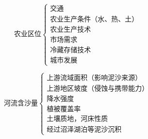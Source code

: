 \documentclass[UTF8]{ctexart}
\begin{document}
\par

\begin{multicols}{2}
    
    \[
        \textbf{农业区位}
        \begin{cases}
            \text{交通}\\
            \text{农业生产条件（水、热、土）}\\
            \text{农业生产技术}\\
            \text{市场需求}\\
            \text{冷藏存储技术}\\
            \text{城市发展}
        \end{cases}
    \]

    \[
        \textbf{河流含沙量}
        \begin{cases}
            \text{上游流域面积（影响泥沙来源）}\\
            \text{上游地区坡度（侵蚀与携带能力）}\\
            \text{降水强度}\\
            \text{植被覆盖率}\\
            \text{土壤质地，河床性质}\\
            \text{经过沼泽湖泊等泥沙沉积}
        \end{cases}
    \]

\end{multicols}

\end{document}
